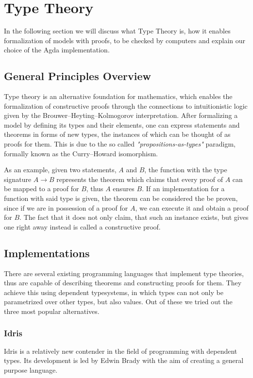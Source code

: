 \section{Type Theory}
In the following section we will discuss what Type Theory is, how it enables formalization of models with proofs, to be checked by computers and explain our choice of the Agda implementation.

\subsection{General Principles Overview}

Type theory is an alternative foundation for mathematics, which enables the formalization of constructive proofs through the connections to intuitionistic logic given by the Brouwer–Heyting–Kolmogorov interpretation. After formalizing a model by defining its types and their elements, one can express statements and theorems in forms of new types, the instances of which can be thought of as proofs for them.
This is due to the so called \textit{"propositions-as-types"} paradigm, formally known as the Curry–Howard isomorphism.

As an example, given two statements, $A$ and $B$, the function with the type signature $A \to B$ represents the theorem which claims that every proof of $A$ can be mapped to a proof for $B$, thus $A$ ensures $B$. If an implementation for a function with said type is given, the theorem can be considered the be proven, since if we are in possession of a proof for $A$, we can execute it and obtain a proof for $B$. The fact that it does not only claim, that such an instance exists, but gives one right away instead is called a constructive proof.

\subsection{Implementations}
There are several existing programming languages that implement type theories, thus are capable of describing theorems and constructing proofs for them. They achieve this using dependent typesystems, in which types can not only be parametrized over other types, but also values. Out of these we tried out the three most popular alternatives.

\subsubsection{Idris}
Idris\cite{Brady2013IdrisAG} is a relatively new contender in the field of programming with dependent types. Its development is led by Edwin Brady with the aim of creating a general purpose language.

